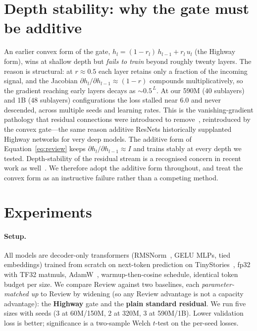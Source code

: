 \documentclass[11pt]{article}
\begin{document}
\section{Depth stability: why the gate must be additive}\label{sec:depth}
An earlier convex form of the gate, $h_l = (1-r_l)\,h_{l-1} + r_l\,u_l$ (the Highway form), wins at shallow
depth but \emph{fails to train} beyond roughly twenty layers. The reason is structural: at $r\approx 0.5$ each
layer retains only a fraction of the incoming signal, and the Jacobian $\partial h_l/\partial h_{l-1}\approx
(1-r)$ compounds multiplicatively, so the gradient reaching early layers decays as ${\sim}0.5^{\,L}$. At our
590M ($40$ sublayers) and 1B ($48$ sublayers) configurations the loss stalled near $6.0$ and never descended,
across multiple seeds and learning rates. This is the vanishing-gradient pathology that residual connections
were introduced to remove~\cite{he2016}, reintroduced by the convex gate---the same reason additive ResNets
historically supplanted Highway networks for very deep models. The additive form of
Equation~\ref{eq:review} keeps $\partial h_l/\partial h_{l-1}\approx I$ and trains stably at every depth we
tested. Depth-stability of the residual stream is a recognised concern in recent work as
well~\cite{kimi2026,xiong2020,ba2016}. We therefore adopt the additive form throughout, and treat the convex
form as an instructive failure rather than a competing method.

\section{Experiments}\label{sec:results}
\paragraph{Setup.} All models are decoder-only transformers (RMSNorm~\cite{zhang2019rmsnorm}, GELU MLPs, tied
embeddings) trained from scratch on next-token prediction on TinyStories~\cite{eldan2023}, fp32 with TF32
matmuls, AdamW~\cite{loshchilov2019}, warmup-then-cosine schedule, identical token budget per size. We compare
Review against two baselines, each \emph{parameter-matched up} to Review by widening (so any Review advantage
is not a capacity advantage): the \textbf{Highway} gate and the \textbf{plain standard residual}. We run five
sizes with seeds (3 at 60M/150M, 2 at 320M, 3 at 590M/1B). Lower validation loss is better; significance is a
two-sample Welch $t$-test on the per-seed losses.
\end{document}

